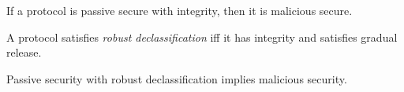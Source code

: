\begin{theorem}
  If a protocol is passive secure with integrity, then it is malicious secure.
\end{theorem}

\begin{definition}
  A protocol satisfies \emph{robust declassification} iff it has integrity and
  satisfies gradual release. 
\end{definition}

\begin{theorem}
  Passive security with robust declassification implies malicious security.
\end{theorem}
